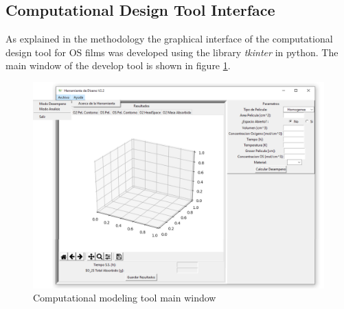 \begin{refsection}
\section{Computational Design Tool Interface}
As explained in the methodology the graphical interface of the computational design tool for OS films was developed  using the library \textit{tkinter} in python. The main window of the develop tool is shown in figure \ref{fig:intefaz_principal}.  

\begin{figure}[ht]
    \centering
    \includegraphics[width=\linewidth]{Documento_Latex/Tesis_1/Imagenes/Interfaz.png}
    \caption{Computational modeling tool main window}
    \label{fig:intefaz_principal}
\end{figure}


\end{refsection}
